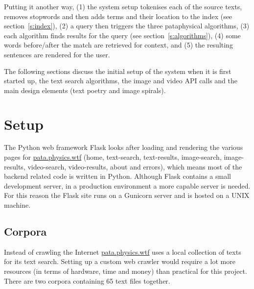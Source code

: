   

Putting it another way, (1) the system setup tokenises each of the source texts, removes stopwords and then adds terms and their location to the index (see section~\ref{s:index}), (2) a query then triggers the three pataphysical algorithms, (3) each algorithm finds results for the query (see section~\ref{s:algorithms}), (4) some words before/after the match are retrieved for context, and (5) the resulting sentences are rendered for the user.

\spirals

The following sections discuss the initial setup of the system when it is first started up, the text search algorithms, the image and video \ac{API} calls and the main design elements (text poetry and image spirals).


\section{Setup}
\label{s:setup}

The Python web framework Flask \autocite{Ronacher2016} looks after loading and rendering the various pages for \url{pata.physics.wtf} (home, text-search, text-results, image-search, image-results, video-search, video-results, about and errors), which means most of the backend related code is written in Python. Although Flask contains a small development server, in a production environment a more capable server is needed. For this reason the Flask site runs on a Gunicorn server \autocite{Gunicorn2016} and is hosted on a UNIX machine.


\subsection{Corpora}
\label{s:corpora}

Instead of crawling the Internet \url{pata.physics.wtf} uses a local collection of texts for its text search. Setting up a custom web crawler would require a lot more resources (in terms of hardware, time and money) than practical for this project. There are two corpora containing 65 text files together. 

